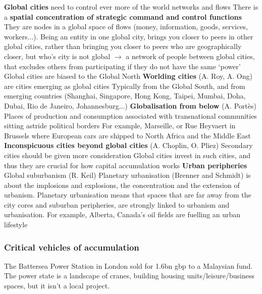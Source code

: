 \documentclass{article}
\begin{document}
\begin{outline}
	\1 \textbf{Global cities} need to control ever more of the world networks and flows
		\2 There is a \textbf{spatial concentration of strategic command and control functions}
		\2 They are nodes in a global space of flows (money, information, goods, services, workers...). Being an entity in one global city, brings you closer to peers in other global cities, rather than bringing you closer to peers who are geographically closer, but who's city is not global $\rightarrow$ a network of people between global cities, that excludes others from participating if they do not have the same `power'
		\2 Global cities are biased to the Global North
	\1 \textbf{Worlding cities} (A. Roy, A. Ong) are cities emerging as global cities
		\2 Typically from the Global South, and from emerging countries (Shanghai, Singapore, Hong Kong, Taipei, Mumbai, Doha, Dubai, Rio de Janeiro, Johannesburg...)
	\1 \textbf{Globalisation from below} (A. Portès) 
		\2 Places of production and consumption associated with transnational communities sitting astride political borders
		\2 For example, Marseille, or Rue Heyvaert in Brussels where European cars are shipped to North Africa and the Middle East
	\1 \textbf{Inconspicuous cities beyond global cities} (A. Choplin, O. Pliez)
		\2 Secondary cities should be given more consideration
		\2 Global cities invest in such cities, and thus they are crucial for how capital accumulation works
	\1 \textbf{Urban peripheries}
		\2 Global suburbanism (R. Keil)
		\2 Planetary urbanisation (Brenner and Schmidt) is about the implosions and explosions, the concentration and the extension of urbanism. Planetary urbanisation means that spaces that are far away from the city cores and suburban peripheries, are strongly linked to urbanism and urbanisation. For example, Alberta, Canada's oil fields are fuelling an urban lifestyle
\end{outline}

\subsubsection{Critical vehicles of accumulation}

The Battersea Power Station in London sold for 1.6bn gbp to a Malaysian fund. The power state is a landscape of cranes, building housing units/leisure/business spaces, but it isn't a local project.
\end{document}
